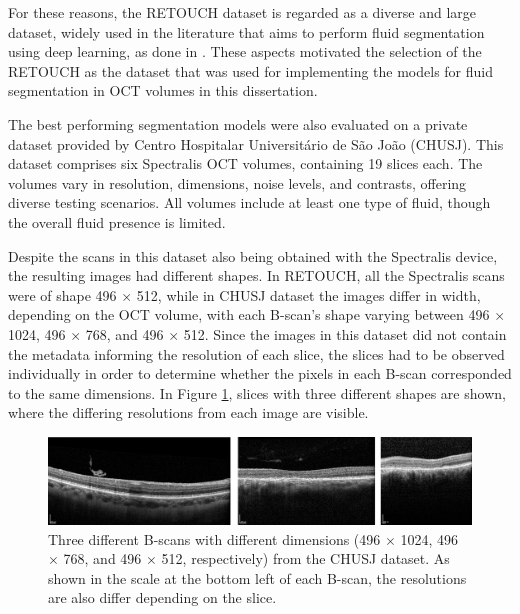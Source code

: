 \par
For these reasons, the RETOUCH dataset is regarded as a diverse and large dataset, widely used in the literature that aims to perform fluid segmentation using deep learning, as done in \parencite{Rahil2023, Zhang2023, Xing2022, Tang2022, Liu2024, Li2023, Hassan2021b, Lu2019}. These aspects motivated the selection of the RETOUCH as the dataset that was used for implementing the models for fluid segmentation in OCT volumes in this dissertation.
\par
The best performing segmentation models were also evaluated on a private dataset provided by Centro Hospitalar Universitário de São João (CHUSJ). This dataset comprises six Spectralis OCT volumes, containing 19 slices each. The volumes vary in resolution, dimensions, noise levels, and contrasts, offering diverse testing scenarios. All volumes include at least one type of fluid, though the overall fluid presence is limited.
\par
Despite the scans in this dataset also being obtained with the Spectralis device, the resulting images had different shapes. In RETOUCH, all the Spectralis scans were of shape 496 $\times$ 512, while in CHUSJ dataset the images differ in width, depending on the OCT volume, with each B-scan's shape varying between 496 $\times$ 1024, 496 $\times$ 768, and 496 $\times$ 512. Since the images in this dataset did not contain the metadata informing the resolution of each slice, the slices had to be observed individually in order to determine whether the pixels in each B-scan corresponded to the same dimensions. In Figure \ref{fig:CHUSJDifferentResolutions}, slices with three different shapes are shown, where the differing resolutions from each image are visible.

\begin{figure}[!ht]
	\centering
	\includegraphics[width=1.0\linewidth]{figures/CHUSJDifferentResolutions.png}
	\caption{Three different B-scans with different dimensions (496 $\times$ 1024, 496 $\times$ 768, and 496 $\times$ 512, respectively) from the CHUSJ dataset. As shown in the scale at the bottom left of each B-scan, the resolutions are also differ depending on the slice.}
	\label{fig:CHUSJDifferentResolutions}
\end{figure}

